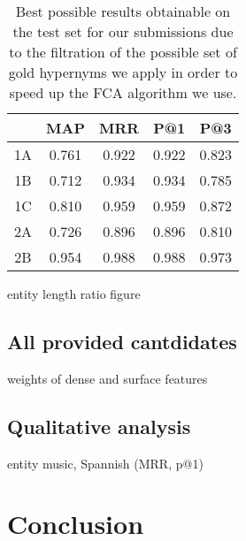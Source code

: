 \documentclass[11pt,a4paper]{article}
\begin{document}
\begin{table}
	\centering
	\begin{tabular}{c|cccc}
		   & MAP & MRR & P@1  & P@3 \\ \hline
		1A & 0.761 & 0.922 & 0.922 & 0.823 \\
		1B & 0.712 & 0.934 & 0.934 & 0.785 \\
		1C & 0.810 & 0.959 & 0.959 & 0.872 \\
		2A & 0.726 & 0.896 & 0.896 & 0.810 \\
		2B & 0.954 & 0.988 & 0.988 & 0.973 \\
	\end{tabular}
	\label{table:upper}
	\caption{Best possible results obtainable on the test set for our
submissions due to the filtration of the possible set of gold hypernyms
we apply in order to speed up the FCA algorithm we use.}
\end{table}

entity length ratio figure %

\subsection{All provided cantdidates}

weights of dense and surface features %

\subsection{Qualitative analysis} %

entity music, Spannish (MRR, p@1)

\section{Conclusion}



\end{document}
